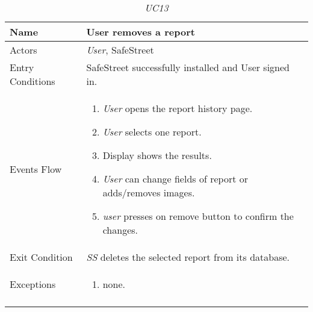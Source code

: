\documentclass[../../../RASD.tex]{subfiles}
\begin{document}
\begin{center}
\begin{longtable}{| p{.35\linewidth} | p{.65\linewidth} |}
\hline
\textbf{Name} & \textbf{User removes a report}\\ \hline
Actors & \textit{User}, SafeStreet\\ \hline
Entry Conditions & SafeStreet successfully installed and User signed in.\\ \hline
Events Flow &
\begin{enumerate}
\item \textit{User} opens the report history page.
\item \textit{User} selects one report.
\item  Display shows the results.
\item \textit{User} can change fields of report or adds/removes images.
\item \textit{user} presses on remove button to confirm the changes.
\end{enumerate}
\\ \hline
Exit Condition & \textit{SS} deletes the selected report from its database.\\ \hline
Exceptions &
\begin{enumerate}
\item none.
\end{enumerate}
\\
\hline
\caption{\textit{UC13}}
\end{longtable}
\end{center}
\newpage
\end{document}
